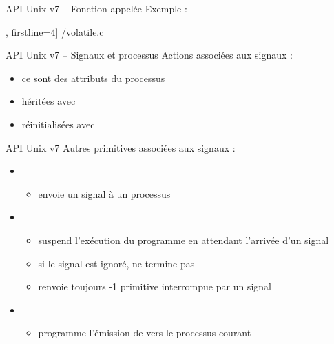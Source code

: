 \begin {frame} {API Unix v7 -- Fonction appelée}
    Exemple :

    \fD\lstmonstyle, firstline=4] {\inc/volatile.c}

\end {frame}

\begin {frame} {API Unix v7 -- Signaux et processus}
    Actions associées aux signaux :
    \begin {itemize}
	\item ce sont des attributs du processus
	\item héritées avec 
	\item réinitialisées avec 
    \end {itemize}
\end {frame}

\begin {frame} {API Unix v7}
    Autres primitives associées aux signaux :

    \begin {itemize}
	\item {}

	    \begin {itemize}
		\item envoie un signal à un processus
	    \end {itemize}

	\item {}

	    \begin {itemize}
		\item suspend l'exécution du programme en attendant
		    l'arrivée d'un signal

		\item si le signal est ignoré,  ne
		    termine pas

		\item {} renvoie toujours -1 \implique
		    primitive interrompue par un signal

	    \end {itemize}

	\item {}

	    \begin {itemize}
		\item programme l'émission de 
		    vers le processus courant
	    \end {itemize}

    \end {itemize}
\end {frame}

